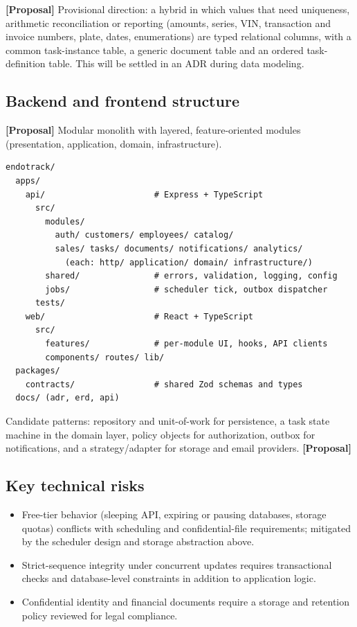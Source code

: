 \documentclass[11pt,a4paper]{article}
\newcommand{\tagprop}{\textcolor{orange!80!black}{\textbf{[Proposal]}}}
\begin{document}
\tagprop{} Provisional direction: a hybrid in which values that need uniqueness, arithmetic reconciliation or reporting (amounts, series, VIN, transaction and invoice numbers, plate, dates, enumerations) are typed relational columns, with a common task-instance table, a generic document table and an ordered task-definition table. This will be settled in an ADR during data modeling.

\subsection{Backend and frontend structure}

\tagprop{} Modular monolith with layered, feature-oriented modules (presentation, application, domain, infrastructure).

\begin{verbatim}
endotrack/
  apps/
    api/                      # Express + TypeScript
      src/
        modules/
          auth/ customers/ employees/ catalog/
          sales/ tasks/ documents/ notifications/ analytics/
            (each: http/ application/ domain/ infrastructure/)
        shared/               # errors, validation, logging, config
        jobs/                 # scheduler tick, outbox dispatcher
      tests/
    web/                      # React + TypeScript
      src/
        features/             # per-module UI, hooks, API clients
        components/ routes/ lib/
  packages/
    contracts/                # shared Zod schemas and types
  docs/ (adr, erd, api)
\end{verbatim}

Candidate patterns: repository and unit-of-work for persistence, a task state machine in the domain layer, policy objects for authorization, outbox for notifications, and a strategy/adapter for storage and email providers. \tagprop{}

\subsection{Key technical risks}

\begin{itemize}
	\item Free-tier behavior (sleeping API, expiring or pausing databases, storage quotas) conflicts with scheduling and confidential-file requirements; mitigated by the scheduler design and storage abstraction above.
	\item Strict-sequence integrity under concurrent updates requires transactional checks and database-level constraints in addition to application logic.
	\item Confidential identity and financial documents require a storage and retention policy reviewed for legal compliance.
\end{itemize}
\end{document}
